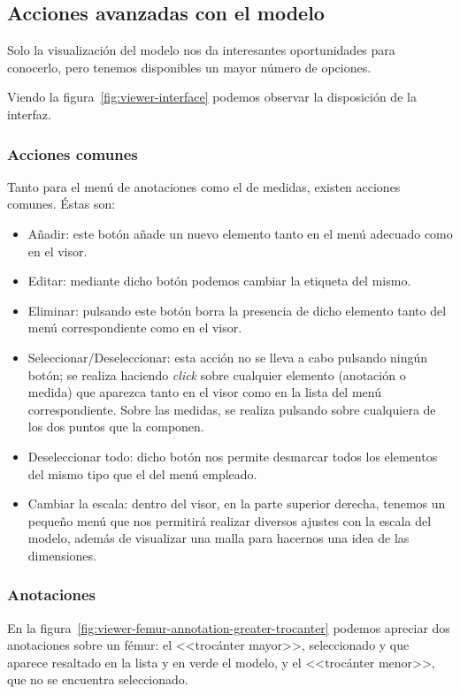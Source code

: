 \subsection{Acciones avanzadas con el modelo}
Solo la visualización del modelo nos da interesantes oportunidades para conocerlo, pero tenemos disponibles un mayor número de opciones.

Viendo la figura~\ref{fig:viewer-interface} podemos observar la disposición de la interfaz.

\subsubsection{Acciones comunes}
Tanto para el menú de anotaciones como el de medidas, existen acciones comunes. Éstas son:
\begin{itemize}
	\item Añadir: este botón añade un nuevo elemento tanto en el menú adecuado como en el visor.
	\item Editar: mediante dicho botón podemos cambiar la etiqueta del mismo.
	\item Eliminar: pulsando este botón borra la presencia de dicho elemento tanto del menú correspondiente como en el visor.
	\item Seleccionar/Deseleccionar: esta acción no se lleva a cabo pulsando ningún botón; se realiza haciendo \textit{click} sobre cualquier elemento (anotación o medida) que aparezca tanto en el visor como en la lista del menú correspondiente. Sobre las medidas, se realiza pulsando sobre cualquiera de los dos puntos que la componen.
	\item Deseleccionar todo: dicho botón nos permite desmarcar todos los elementos del mismo tipo que el del menú empleado.
	\item Cambiar la escala: dentro del visor, en la parte superior derecha, tenemos un pequeño menú que nos permitirá realizar diversos ajustes con la escala del modelo, además de visualizar una malla para hacernos una idea de las dimensiones.
\end{itemize}

\subsubsection{Anotaciones}
En la figura~\ref{fig:viewer-femur-annotation-greater-trocanter} podemos apreciar dos anotaciones sobre un fémur: el <<trocánter mayor>>, seleccionado y que aparece resaltado en la lista y en verde el modelo, y el <<trocánter menor>>, que no se encuentra seleccionado.


